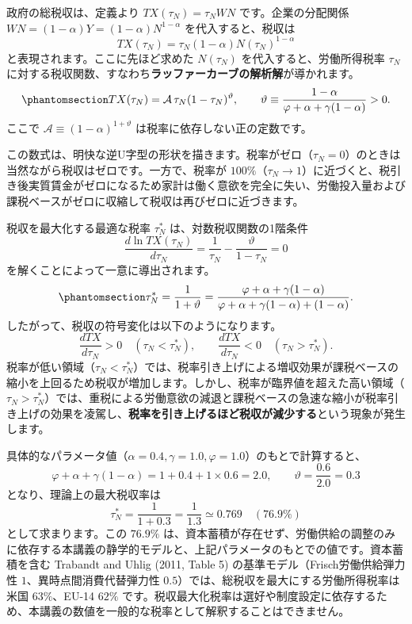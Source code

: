 \documentclass[
  japanese,
  lualatex,
  ja=standard,
  12pt,
  a4paper]{ltjsarticle}
\begin{document}
政府の総税収は、定義より \(TX(\tau_N) = \tau_N W N\)
です。企業の分配関係 \(W N = (1-\alpha) Y = (1-\alpha) N^{1-\alpha}\)
を代入すると、税収は \[
TX(\tau_N) = \tau_N (1-\alpha) N(\tau_N)^{1-\alpha}
\] と表現されます。ここに先ほど求めた \(N(\tau_N)\)
を代入すると、労働所得税率 \(\tau_N\)
に対する税収関数、すなわち\textbf{ラッファーカーブの解析解}が導かれます。
\begin{equation}\protect\phantomsection\label{eq-laffer-revenue}{
TX(\tau_N) = \mathcal{A}\, \tau_N (1-\tau_N)^\vartheta, \qquad \vartheta \equiv \frac{1-\alpha}{\varphi+\alpha+\gamma(1-\alpha)} > 0.
}\end{equation} ここで \(\mathcal{A} \equiv (1-\alpha)^{1+\vartheta}\)
は税率に依存しない正の定数です。

この数式は、明快な逆U字型の形状を描きます。税率がゼロ（\(\tau_N = 0\)）のときは当然ながら税収はゼロです。一方で、税率が
\(100\%\)（\(\tau_N \to 1\)）に近づくと、税引き後実質賃金がゼロになるため家計は働く意欲を完全に失い、労働投入量および課税ベースがゼロに収縮して税収は再びゼロに近づきます。

税収を最大化する最適な税率 \(\tau_N^*\) は、対数税収関数の1階条件 \[
\frac{d\ln TX(\tau_N)}{d\tau_N} = \frac{1}{\tau_N} - \frac{\vartheta}{1-\tau_N} = 0
\] を解くことによって一意に導出されます。
\begin{equation}\protect\phantomsection\label{eq-laffer-peak}{
\tau_N^* = \frac{1}{1+\vartheta} = \frac{\varphi + \alpha + \gamma(1-\alpha)}{\varphi + \alpha + \gamma(1-\alpha) + (1-\alpha)}.
}\end{equation} したがって、税収の符号変化は以下のようになります。 \[
\frac{d TX}{d\tau_N} > 0 \quad (\tau_N < \tau_N^*), \qquad \frac{d TX}{d\tau_N} < 0 \quad (\tau_N > \tau_N^*).
\]
税率が低い領域（\(\tau_N < \tau_N^*\)）では、税率引き上げによる増収効果が課税ベースの縮小を上回るため税収が増加します。しかし、税率が臨界値を超えた高い領域（\(\tau_N > \tau_N^*\)）では、重税による労働意欲の減退と課税ベースの急速な縮小が税率引き上げの効果を凌駕し、\textbf{税率を引き上げるほど税収が減少する}という現象が発生します。

具体的なパラメータ値（\(\alpha = 0.4, \gamma = 1.0, \varphi = 1.0\)）のもとで計算すると、
\[
\varphi + \alpha + \gamma(1-\alpha) = 1 + 0.4 + 1 \times 0.6 = 2.0, \qquad \vartheta = \frac{0.6}{2.0} = 0.3
\] となり、理論上の最大税収率は \[
\tau_N^* = \frac{1}{1 + 0.3} = \frac{1}{1.3} \simeq 0.769 \quad (76.9\%)
\] として求まります。この \(76.9\%\)
は、資本蓄積が存在せず、労働供給の調整のみに依存する本講義の静学的モデルと、上記パラメータのもとでの値です。資本蓄積を含む
Trabandt and Uhlig (2011, Table 5) の基準モデル（Frisch労働供給弾力性
\(1\)、異時点間消費代替弾力性
\(0.5\)）では、総税収を最大にする労働所得税率は米国 \(63\%\)、EU-14
\(62\%\)
です。税収最大化税率は選好や制度設定に依存するため、本講義の数値を一般的な税率として解釈することはできません。
\end{document}

